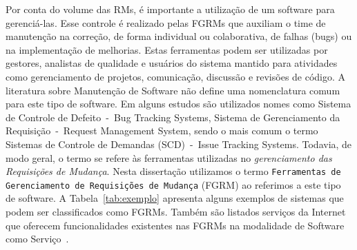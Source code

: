 Por conta do volume das RMs, é importante a utilização de um software para
gerenciá-las. Esse controle é realizado pelas FGRMs que auxiliam o time de
manutenção na correção, de forma individual ou colaborativa, de falhas (bugs) ou
na implementação de melhorias. Estas ferramentas podem ser utilizadas por
gestores, analistas de qualidade e usuários do sistema mantido para atividades
como gerenciamento de projetos, comunicação, discussão e revisões de código. A
literatura sobre Manutenção de Software não define uma nomenclatura comum para
este tipo de software. Em alguns estudos são utilizados nomes como Sistema de
Controle de Defeito~-~Bug Tracking Systems, Sistema de Gerenciamento da
Requisição~-~Request Management System, sendo o mais comum o termo Sistemas de
Controle de Demandas (SCD)~-~Issue Tracking Systems. Todavia, de modo geral, o
termo se refere às ferramentas utilizadas no \textit{gerenciamento das
    Requisições de Mudança}. Nesta dissertação utilizamos o termo
\texttt{Ferramentas de Gerenciamento de Requisições de Mudança} (FGRM) ao
referimos a este tipo de software. A Tabela~\ref{tab:exemplo} apresenta alguns
exemplos de sistemas que podem ser classificados como FGRMs. Também são listados
serviços da Internet que oferecem funcionalidades existentes nas FGRMs na
modalidade de Software como Serviço~\cite{fox2013engineering}.

\begin{table}[htpb]
\centering
{}
\caption{Exemplos de ferramentas e serviços da Internet que podem ser
    classificados como FGRMs. Extraído de~\cite{cavalcanti2014challenges}}
\label{tab:exemplo}
\end{table}

